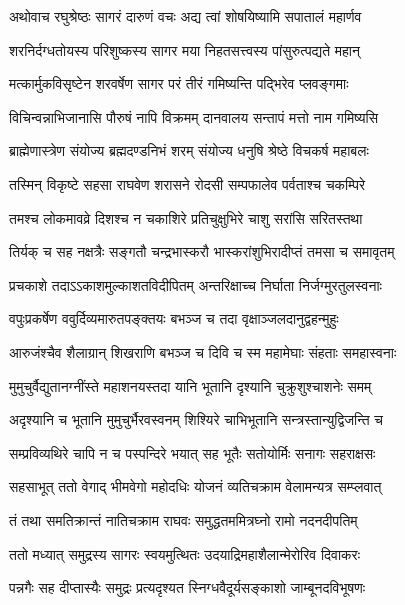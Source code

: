 
\twolineshloka
{अथोवाच रघुश्रेष्ठः सागरं दारुणं वचः}
{अद्य त्वां शोषयिष्यामि सपातालं महार्णव} %

\twolineshloka
{शरनिर्दग्धतोयस्य परिशुष्कस्य सागर}
{मया निहतसत्त्वस्य पांसुरुत्पद्यते महान्} %

\twolineshloka
{मत्कार्मुकविसृष्टेन शरवर्षेण सागर}
{परं तीरं गमिष्यन्ति पद्भिरेव प्लवङ्गमाः} %

\twolineshloka
{विचिन्वन्नाभिजानासि पौरुषं नापि विक्रमम्}
{दानवालय सन्तापं मत्तो नाम गमिष्यसि} %

\twolineshloka
{ब्राह्मेणास्त्रेण संयोज्य ब्रह्मदण्डनिभं शरम्}
{संयोज्य धनुषि श्रेष्ठे विचकर्ष महाबलः} %

\twolineshloka
{तस्मिन् विकृष्टे सहसा राघवेण शरासने}
{रोदसी सम्पफालेव पर्वताश्च चकम्पिरे} %

\twolineshloka
{तमश्च लोकमावव्रे दिशश्च न चकाशिरे}
{प्रतिचुक्षुभिरे चाशु सरांसि सरितस्तथा} %

\twolineshloka
{तिर्यक् च सह नक्षत्रैः सङ्गतौ चन्द्रभास्करौ}
{भास्करांशुभिरादीप्तं तमसा च समावृतम्} %

\twolineshloka
{प्रचकाशे तदाऽऽकाशमुल्काशतविदीपितम्}
{अन्तरिक्षाच्च निर्घाता निर्जग्मुरतुलस्वनाः} %

\twolineshloka
{वपुःप्रकर्षेण ववुर्दिव्यमारुतपङ्क्तयः}
{बभञ्ज च तदा वृक्षाञ्जलदानुद्वहन्मुहुः} %

\twolineshloka
{आरुजंश्चैव शैलाग्रान् शिखराणि बभञ्ज च}
{दिवि च स्म महामेघाः संहताः समहास्वनाः} %

\twolineshloka
{मुमुचुर्वैद्युतानग्नींस्ते महाशनयस्तदा}
{यानि भूतानि दृश्यानि चुक्रुशुश्चाशनेः समम्} %

\twolineshloka
{अदृश्यानि च भूतानि मुमुचुर्भैरवस्वनम्}
{शिश्यिरे चाभिभूतानि सन्त्रस्तान्युद्विजन्ति च} %

\twolineshloka
{सम्प्रविव्यथिरे चापि न च पस्पन्दिरे भयात्}
{सह भूतैः सतोयोर्मिः सनागः सहराक्षसः} %

\twolineshloka
{सहसाभूत् ततो वेगाद् भीमवेगो महोदधिः}
{योजनं व्यतिचक्राम वेलामन्यत्र सम्प्लवात्} %

\twolineshloka
{तं तथा समतिक्रान्तं नातिचक्राम राघवः}
{समुद्धतममित्रघ्नो रामो नदनदीपतिम्} %

\twolineshloka
{ततो मध्यात् समुद्रस्य सागरः स्वयमुत्थितः}
{उदयाद्रिमहाशैलान्मेरोरिव दिवाकरः} %

\twolineshloka
{पन्नगैः सह दीप्तास्यैः समुद्रः प्रत्यदृश्यत}
{स्निग्धवैदूर्यसङ्काशो जाम्बूनदविभूषणः} %

